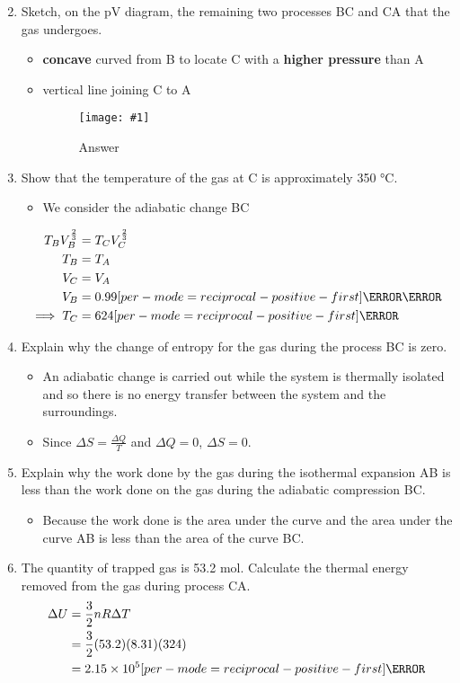 \documentclass[a4paper,12pt]{article}
\let\oldsi\si
\renewcommand{\si}[1]{\oldsi[per-mode=reciprocal-positive-first]{#1}}
\newcommand{\img}[4]{\begin{center}
  \begin{figure}[H]
    \centering
    \texttt{[image: \#1]}
    \caption{#3}
    \label{fig:#4}
  \end{figure}
\end{center}}
\begin{document}
\begin{enumerate}[label=(\alph*)]
  \setcounter{enumi}{1}
  \item Sketch, on the pV diagram, the remaining two processes BC and CA that the gas undergoes.
        \begin{itemize}
          \item \textbf{concave} curved from B to locate C with a \textbf{higher pressure} than A
          \item vertical line joining C to A
                \img{ex/10.png}{0.5}{Answer}{ex10}
        \end{itemize}

  \item Show that the temperature of the gas at C is approximately 350 °C.
        \begin{itemize}
          \item We consider the adiabatic change BC
        \end{itemize}
        \begin{align*}
          T_BV_B^{\frac{2}{3}} & = T_CV_C^{\frac{2}{3}}   \\
          T_B                  & = T_A                    \\
          V_C                  & = V_A                    \\
          V_B                  & = 0.99 \si{\meter\cubed} \\
          \implies T_C         & = 624 \si{\kelvin}
        \end{align*}
  \item Explain why the change of entropy for the gas during the process BC is zero.
        \begin{itemize}
          \item An adiabatic change is carried out while the system is thermally isolated and so there is no energy transfer between the system and the surroundings.
          \item Since $\Delta S = \frac{\Delta Q}{T}$ and $\Delta Q = 0$, $\Delta S = 0$.
        \end{itemize}
  \item Explain why the work done by the gas during the isothermal expansion AB is less than the work done on the gas during the adiabatic compression BC.
        \begin{itemize}
          \item Because the work done is the area under the curve and the area under the curve AB is less than the area of the curve BC.
        \end{itemize}
  \item The quantity of trapped gas is 53.2 mol. Calculate the thermal energy removed from the
        gas during process CA.
        \begin{align*}
          \Delta U & = \frac{3}{2}nR\Delta T        \\
                   & = \frac{3}{2}(53.2)(8.31)(324) \\
                   & = 2.15 \times 10^5 \si{\J}
        \end{align*}
\end{enumerate}
\end{document}
